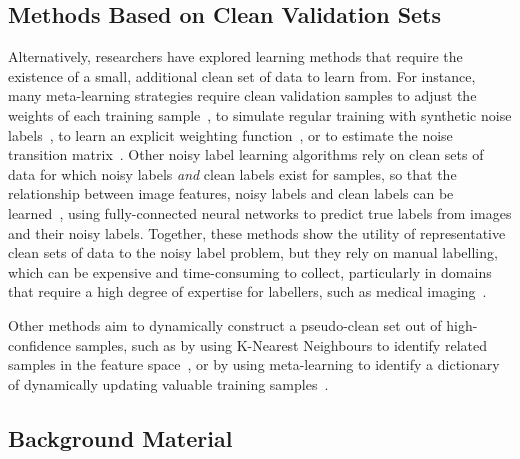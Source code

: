 \documentclass[10pt,twocolumn,letterpaper]{article}
\begin{document}
\subsection{Methods Based on Clean Validation Sets}

Alternatively, researchers have explored learning methods that require the existence of a small, additional clean set of data to learn from. For instance, many meta-learning strategies require clean validation samples to adjust the weights of each training sample~\cite{ren2018learning}, to simulate regular training with synthetic noise labels~\cite{li2019learning}, to learn an explicit weighting function~\cite{shu2019meta}, or to estimate the noise transition matrix~\cite{wang2020training}.
Other noisy label learning algorithms rely on clean sets of data for which noisy labels \textit{and} clean labels exist for samples, so that the relationship between image features, noisy labels and clean labels can be learned~\cite{veit2017learning, inoue2017multi, gu2021instancedependent}, using fully-connected neural networks to predict true labels from images and their noisy labels. 
Together, these methods show the utility of representative clean sets of data to the noisy label problem, but they rely on manual labelling, which can be expensive and time-consuming to collect, particularly in domains that require a high degree of expertise for labellers, such as medical imaging~\cite{lloyd2004observer, zhang2020distilling}.

Other methods aim to dynamically construct a pseudo-clean set out of high-confidence samples, such as by using K-Nearest Neighbours to identify related samples in the feature space~\cite{bahri2020deep, ortego2020multi}, or by using meta-learning to identify a dictionary of dynamically updating valuable training samples~\cite{zhang2021learning3}. 


\subsection{Background Material}
\end{document}
